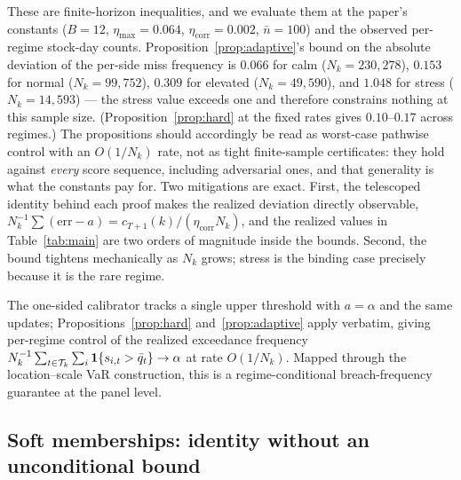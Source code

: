 \begin{remark}
\label{rem:numeric}
These are finite-horizon inequalities, and we evaluate
them at the paper's constants ($B = 12$, $\eta_{\max} = 0.064$,
$\eta_{\mathrm{corr}} = 0.002$, $\bar n = 100$) and the observed
per-regime stock-day counts. Proposition~\ref{prop:adaptive}'s bound on
the absolute deviation of the per-side miss frequency is $0.066$ for
calm ($N_k = 230{,}278$), $0.153$ for normal ($N_k = 99{,}752$),
$0.309$ for elevated ($N_k = 49{,}590$), and $1.048$ for stress
($N_k = 14{,}593$) --- the stress value exceeds one and therefore
constrains nothing at this sample size. (Proposition~\ref{prop:hard} at
the fixed rates gives $0.10$--$0.17$ across regimes.) The propositions
should accordingly be read as worst-case pathwise control with an
$O(1/N_k)$ rate, not as tight finite-sample certificates: they hold
against \emph{every} score sequence, including adversarial ones, and
that generality is what the constants pay for. Two mitigations are
exact. First, the telescoped identity behind each proof makes the
realized deviation directly observable, $N_k^{-1} \sum (\mathrm{err} -
a) = c_{T+1}(k) / (\eta_{\mathrm{corr}} N_k)$, and the realized values
in Table~\ref{tab:main} are two orders of magnitude inside the bounds.
Second, the bound tightens mechanically as $N_k$ grows; stress is the
binding case precisely because it is the rare regime.
\end{remark}

\begin{proposition}\label{prop:onesided}
The one-sided calibrator tracks a single upper threshold with $a = \alpha$
and the same updates; Propositions~\ref{prop:hard}
and~\ref{prop:adaptive} apply verbatim, giving per-regime control of the
realized exceedance frequency
$\smash{ N_k^{-1} \sum_{t \in \mathcal{T}_k} \sum_i
\mathbf{1}\{ s_{i,t} > \bar q_t \} } \to \alpha$ at rate $O(1/N_k)$.
Mapped through the location--scale VaR construction, this is a
regime-conditional breach-frequency guarantee at the panel level.
\end{proposition}

\subsection{Soft memberships: identity without an unconditional
bound}\label{sec:soft-theory}

